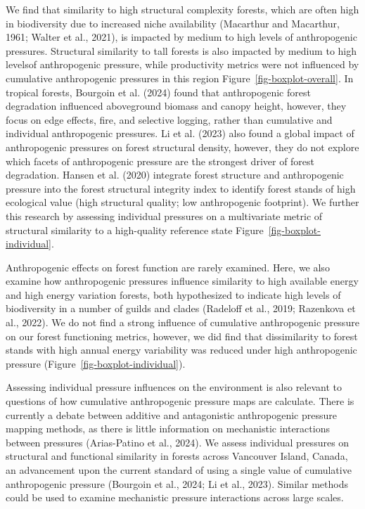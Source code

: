\documentclass[
]{agujournal2019}
\begin{document}
We find that similarity to high structural complexity forests, which are
often high in biodiversity due to increased niche availability
(Macarthur and Macarthur, 1961; Walter et al., 2021), is impacted by
medium to high levels of anthropogenic pressures. Structural similarity
to tall forests is also impacted by medium to high levelsof
anthropogenic pressure, while productivity metrics were not influenced
by cumulative anthropogenic pressures in this region
Figure~\ref{fig-boxplot-overall}. In tropical forests, Bourgoin et al.
(2024) found that anthropogenic forest degradation influenced
aboveground biomass and canopy height, however, they focus on edge
effects, fire, and selective logging, rather than cumulative and
individual anthropogenic pressures. Li et al. (2023) also found a global
impact of anthropogenic pressures on forest structural density, however,
they do not explore which facets of anthropogenic pressure are the
strongest driver of forest degradation. Hansen et al. (2020) integrate
forest structure and anthropogenic pressure into the forest structural
integrity index to identify forest stands of high ecological value (high
structural quality; low anthropogenic footprint). We further this
research by assessing individual pressures on a multivariate metric of
structural similarity to a high-quality reference state
Figure~\ref{fig-boxplot-individual}.

Anthropogenic effects on forest function are rarely examined. Here, we
also examine how anthropogenic pressures influence similarity to high
available energy and high energy variation forests, both hypothesized to
indicate high levels of biodiversity in a number of guilds and clades
(Radeloff et al., 2019; Razenkova et al., 2022). We do not find a strong
influence of cumulative anthropogenic pressure on our forest functioning
metrics, however, we did find that dissimilarity to forest stands with
high annual energy variability was reduced under high anthropogenic
pressure (Figure~\ref{fig-boxplot-individual}).

Assessing individual pressure influences on the environment is also
relevant to questions of how cumulative anthropogenic pressure maps are
calculate. There is currently a debate between additive and antagonistic
anthropogenic pressure mapping methods, as there is little information
on mechanistic interactions between pressures (Arias-Patino et al.,
2024). We assess individual pressures on structural and functional
similarity in forests across Vancouver Island, Canada, an advancement
upon the current standard of using a single value of cumulative
anthropogenic pressure (Bourgoin et al., 2024; Li et al., 2023). Similar
methods could be used to examine mechanistic pressure interactions
across large scales.
\end{document}
